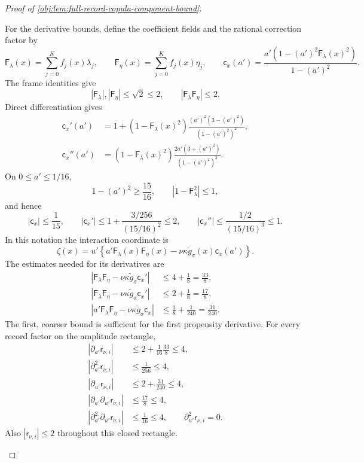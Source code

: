 \begin{proof}[Proof of \cref{obj:lem:full-record-copula-component-bound}]
\begin{enumerate}
For the derivative bounds, define the coefficient fields and the rational correction factor by
\[
\mathsf F_\lambda(x)=\sum_{j=0}^{K}f_j(x)\lambda_j,
\qquad
\mathsf F_\eta(x)=\sum_{j=0}^{K}f_j(x)\eta_j,
\qquad
\mathsf c_x(a')
 =\frac{a'(1-(a')^2\mathsf F_\lambda(x)^2)}
        {1-(a')^2}.
\]
The frame identities give
\[
|\mathsf F_\lambda|,|\mathsf F_\eta|\le\sqrt2\le2,
\qquad
|\mathsf F_\lambda\mathsf F_\eta|\le2.
\]
Direct differentiation gives
\[
\begin{aligned}
\mathsf c_x'(a')
 &=1+
 (1-\mathsf F_\lambda(x)^2)
 \frac{(a')^2(3-(a')^2)}{(1-(a')^2)^2},\\
\mathsf c_x''(a')
 &=(1-\mathsf F_\lambda(x)^2)
 \frac{2a'(3+(a')^2)}{(1-(a')^2)^3}.
\end{aligned}
\]
On \(0\le a'\le1/16\),
\[
1-(a')^2\ge\frac{15}{16},
\qquad
|1-\mathsf F_\lambda^2|\le1,
\]
and hence
\[
|\mathsf c_x|\le\frac1{15},
\qquad
|\mathsf c_x'|
 \le1+\frac{3/256}{(15/16)^2}\le2,
\qquad
|\mathsf c_x''|
 \le\frac{1/2}{(15/16)^3}\le1.
\]
In this notation the interaction coordinate is
\[
\zeta(x)
 =u'\left\{
 a'\mathsf F_\lambda(x)\mathsf F_\eta(x)
 -\nu\kappa\widetilde g_\sigma(x)\mathsf c_x(a')
 \right\}.
\]
The estimates needed for its derivatives are
\[
\begin{aligned}
|\mathsf F_\lambda\mathsf F_\eta
 -\nu\kappa\widetilde g_\sigma\mathsf c_x'|
 &\le 4+\frac18=\frac{33}{8},\\
|\mathsf F_\lambda\mathsf F_\eta
 -\nu\kappa\widetilde g_\sigma\mathsf c_x'|
 &\le 2+\frac18=\frac{17}{8},\\
|a'\mathsf F_\lambda\mathsf F_\eta
 -\nu\kappa\widetilde g_\sigma\mathsf c_x|
 &\le\frac18+\frac1{240}=\frac{31}{240}.
\end{aligned}
\]
The first, coarser bound is sufficient for the first propensity derivative. For every record factor on the amplitude rectangle,
\[
\begin{aligned}
|\partial_{a'}\mathsf r_{\nu,i}|
 &\le2+\frac1{16}\frac{33}{8}\le4,\\
|\partial_{a'}^2\mathsf r_{\nu,i}|
 &\le\frac1{256}\le4,\\
|\partial_{u'}\mathsf r_{\nu,i}|
 &\le2+\frac{31}{240}\le4,\\
|\partial_{a'}\partial_{u'}\mathsf r_{\nu,i}|
 &\le\frac{17}{8}\le4,\\
|\partial_{a'}^2\partial_{u'}\mathsf r_{\nu,i}|
 &\le\frac1{16}\le4,
\qquad
\partial_{u'}^2\mathsf r_{\nu,i}=0.
\end{aligned}
\]
Also \(|\mathsf r_{\nu,i}|\le2\) throughout this closed rectangle.


\end{enumerate}
\end{proof}
